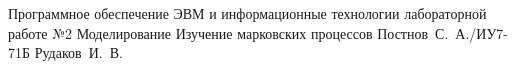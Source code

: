 \documentclass{bmstu}
\begin{document}
	
	{Программное обеспечение ЭВМ и информационные технологии}
	{лабораторной работе №2}
	{Моделирование}
	{Изучение марковских процессов}
	{}
	{Постнов~С.~А./ИУ7-71Б}
	{Рудаков~И.~В.}
	
	\maketableofcontents
	
	
	
	
\end{document}
